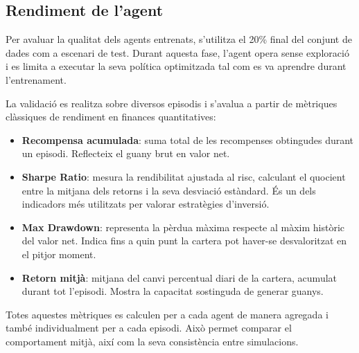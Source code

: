 \documentclass[12pt,a4paper,twoside]{book}
\begin{document}
\subsection{Rendiment de l'agent}

Per avaluar la qualitat dels agents entrenats, s'utilitza el 20\% final del conjunt de dades com a escenari de test. Durant aquesta fase, l'agent opera sense exploració i es limita a executar la seva política optimitzada tal com es va aprendre durant l'entrenament.

La validació es realitza sobre diversos episodis i s'avalua a partir de mètriques clàssiques de rendiment en finances quantitatives:

\begin{itemize}
    \item \textbf{Recompensa acumulada}: suma total de les recompenses obtingudes durant un episodi. Reflecteix el guany brut en valor net.

    \item \textbf{Sharpe Ratio}: mesura la rendibilitat ajustada al risc, calculant el quocient entre la mitjana dels retorns i la seva desviació estàndard. És un dels indicadors més utilitzats per valorar estratègies d'inversió.

    \item \textbf{Max Drawdown}: representa la pèrdua màxima respecte al màxim històric del valor net. Indica fins a quin punt la cartera pot haver-se desvaloritzat en el pitjor moment.

    \item \textbf{Retorn mitjà}: mitjana del canvi percentual diari de la cartera, acumulat durant tot l'episodi. Mostra la capacitat sostinguda de generar guanys.
\end{itemize}

Totes aquestes mètriques es calculen per a cada agent de manera agregada i també individualment per a cada episodi. Això permet comparar el comportament mitjà, així com la seva consistència entre simulacions.
\end{document}

